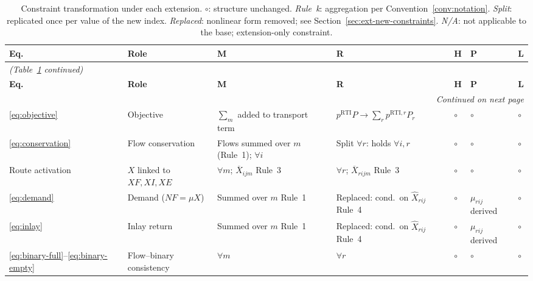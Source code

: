 \begin{longtable}{lp{1.6cm}p{2.1cm}p{2.1cm}p{1.6cm}p{1.6cm}p{2.2cm}}
\caption{Constraint transformation under each extension.
  $\circ$: structure unchanged.
  \emph{Rule~k}: aggregation per Convention~\ref{conv:notation}.
  \emph{Split}: replicated once per value of the new index.
  \emph{Replaced}: nonlinear form removed; see
  Section~\ref{sec:ext-new-constraints}.
  \emph{N/A}: not applicable to the base; extension-only constraint.}
\label{tab:constraint-transform}\\
\toprule
\textbf{Eq.} & \textbf{Role}
  & \textbf{M} & \textbf{R} & \textbf{H} & \textbf{P} & \textbf{L} \\
\midrule
\endfirsthead
\multicolumn{7}{l}{\small\itshape (Table~\ref{tab:constraint-transform} continued)}\\
\toprule
\textbf{Eq.} & \textbf{Role}
  & \textbf{M} & \textbf{R} & \textbf{H} & \textbf{P} & \textbf{L} \\
\midrule
\endhead
\midrule
\multicolumn{7}{r}{\small\itshape Continued on next page}\\
\endfoot
\bottomrule
\endlastfoot

\eqref{eq:objective}
  & Objective
  & $\sum_m$ added to transport term
  & $p^{\text{RTI}}P \to \sum_r p^{\text{RTI},r}P_r$
  & $\circ$
  & $\circ$
  & $\circ$ \\[4pt]

\eqref{eq:conservation}
  & Flow conservation
  & Flows summed over $m$ (Rule~1); $\forall i$
  & Split $\forall r$: holds $\forall i,r$
  & $\circ$
  & $\circ$
  & $\circ$ \\[4pt]

Route activation
  & $X$ linked to $XF,XI,XE$
  & $\forall m$; $\overline{X}_{ijm}$ Rule~3
  & $\forall r$; $\overline{X}_{rijm}$ Rule~3
  & $\circ$
  & $\circ$
  & $\circ$ \\[4pt]

\eqref{eq:demand}
  & Demand ($NF = \mu X$)
  & Summed over $m$ Rule~1
  & Replaced: cond.\ on $\hat{X}_{rij}$ Rule~4
  & $\circ$
  & $\mu_{rij}$ derived
  & $\circ$ \\[4pt]

\eqref{eq:inlay}
  & Inlay return
  & Summed over $m$ Rule~1
  & Replaced: cond.\ on $\hat{X}_{rij}$ Rule~4
  & $\circ$
  & $\mu_{rij}$ derived
  & $\circ$ \\[4pt]

\eqref{eq:binary-full}--\eqref{eq:binary-empty}
  & Flow--binary consistency
  & $\forall m$
  & $\forall r$
  & $\circ$
  & $\circ$
  & $\circ$ \\[4pt]


\end{longtable}
